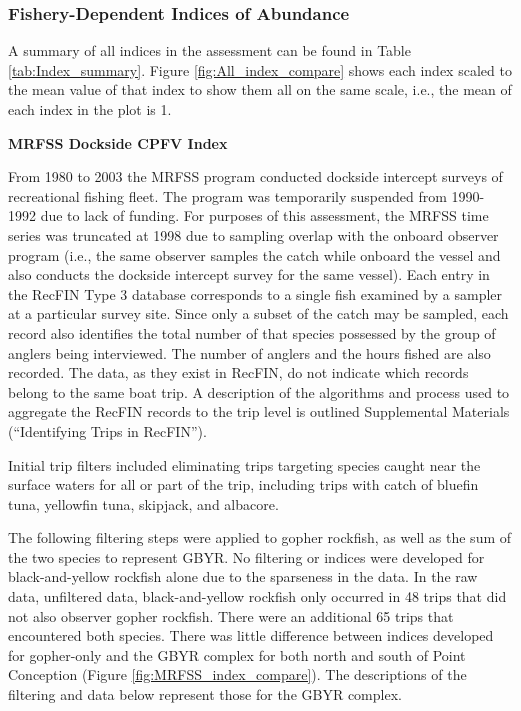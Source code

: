\documentclass[12pt,]{article}
\begin{document}
\subsubsection{Fishery-Dependent Indices of
Abundance}\label{fishery-dependent-indices-of-abundance}

A summary of all indices in the assessment can be found in Table
\ref{tab:Index_summary}. Figure \ref{fig:All_index_compare} shows each
index scaled to the mean value of that index to show them all on the
same scale, i.e., the mean of each index in the plot is 1.

\textbf{MRFSS Dockside CPFV Index}

From 1980 to 2003 the MRFSS program conducted dockside intercept surveys
of recreational fishing fleet. The program was temporarily suspended
from 1990-1992 due to lack of funding. For purposes of this assessment,
the MRFSS time series was truncated at 1998 due to sampling overlap with
the onboard observer program (i.e., the same observer samples the catch
while onboard the vessel and also conducts the dockside intercept survey
for the same vessel). Each entry in the RecFIN Type 3 database
corresponds to a single fish examined by a sampler at a particular
survey site. Since only a subset of the catch may be sampled, each
record also identifies the total number of that species possessed by the
group of anglers being interviewed. The number of anglers and the hours
fished are also recorded. The data, as they exist in RecFIN, do not
indicate which records belong to the same boat trip. A description of
the algorithms and process used to aggregate the RecFIN records to the
trip level is outlined Supplemental Materials (``Identifying Trips in
RecFIN'').

Initial trip filters included eliminating trips targeting species caught
near the surface waters for all or part of the trip, including trips
with catch of bluefin tuna, yellowfin tuna, skipjack, and albacore.

The following filtering steps were applied to gopher rockfish, as well
as the sum of the two species to represent GBYR. No filtering or indices
were developed for black-and-yellow rockfish alone due to the sparseness
in the data. In the raw data, unfiltered data, black-and-yellow rockfish
only occurred in 48 trips that did not also observer gopher rockfish.
There were an additional 65 trips that encountered both species. There
was little difference between indices developed for gopher-only and the
GBYR complex for both north and south of Point Conception (Figure
\ref{fig:MRFSS_index_compare}). The descriptions of the filtering and
data below represent those for the GBYR complex.
\end{document}
